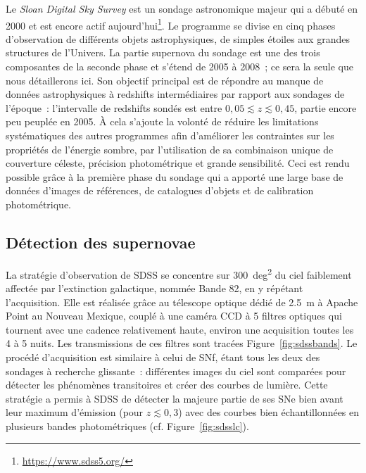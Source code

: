 \documentclass[../main/main.tex]{subfiles}
\begin{document}
Le \textit{Sloan Digital Sky Survey} \citep[SDSS,][]{frieman2008, sako2008,
sako2018} est un sondage astronomique majeur qui a débuté en 2000 et est encore
actif
aujourd'hui\footnote{\href{https://www.sdss5.org/}{https://www.sdss5.org/}}. Le
programme se divise en cinq phases d'observation de différents objets
astrophysiques, de simples étoiles aux grandes structures de l'Univers. La
partie supernova du sondage est une des trois composantes de la seconde phase et
s'étend de 2005 à 2008~; ce sera la seule que nous détaillerons ici. Son
objectif principal est de répondre au manque de données astrophysiques à
redshifts intermédiaires par rapport aux sondages de l'époque~: l'intervalle de
redshifts sondés est entre $0,05 \lesssim z \lesssim 0,45$, partie encore peu
peuplée en 2005. À cela s'ajoute la volonté de réduire les limitations
systématiques des autres programmes afin d'améliorer les contraintes sur les
propriétés de l'énergie sombre, par l'utilisation de sa combinaison unique de
couverture céleste, précision photométrique et grande sensibilité. Ceci est
rendu possible grâce à la première phase du sondage qui a apporté une large base
de données d'images de références, de catalogues d'objets et de calibration
photométrique.

\subsection{Détection des supernovae}\label{ssec:sdssdetec}

La stratégie d'observation de SDSS se concentre sur \SI{300}{deg^2} du ciel
faiblement affectée par l'extinction galactique, nommée Bande 82, en y répétant
l'acquisition. Elle est réalisée grâce au télescope optique dédié de \SI{2,5}{m}
\citep{gunn2006} à Apache Point au Nouveau Mexique, couplé à une caméra CCD
\citep{gunn1998} à 5 filtres optiques \citep[$ugriz$,][]{fukugita1996} qui
tournent avec une cadence relativement haute, environ une acquisition toutes les
4 à 5 nuits. Les transmissions de ces filtres sont tracées
Figure~\ref{fig:sdssbands}. Le procédé d'acquisition est similaire à celui de
SNf, étant tous les deux des sondages à recherche glissante~: différentes images
du ciel sont comparées pour détecter les phénomènes transitoires et créer des
courbes de lumière. Cette stratégie a permis à SDSS de détecter la majeure
partie de ses SNe bien avant leur maximum d'émission (pour $z \lesssim 0,3$)
avec des courbes bien échantillonnées en plusieurs bandes photométriques (cf.
Figure~\ref{fig:sdsslc}).
\end{document}
